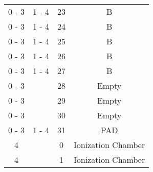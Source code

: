 \begin{tabular}{cccc}
0 - 3  &  1 - 4   &  23     &  B                    		   					 \\
0 - 3  &  1 - 4   &  24     &  B                    		   					 \\
0 - 3  &  1 - 4   &  25     &  B                    		   					 \\
0 - 3  &  1 - 4   &  26     &  B                    		   					 \\
0 - 3  &  1 - 4   &  27     &  B                    		   					 \\
0 - 3  &          &  28     &  Empty                		   					 \\
0 - 3  &          &  29     &  Empty                		   					 \\
0 - 3  &          &  30     &  Empty                		   					 \\
0 - 3  &  1 - 4   &  31     &  PAD                  		   					 \\
  4    &          &  0      &  Ionization Chamber   		   					 \\
  4    &          &  1      &  Ionization Chamber   		   					 \\
\hline
\end{tabular}